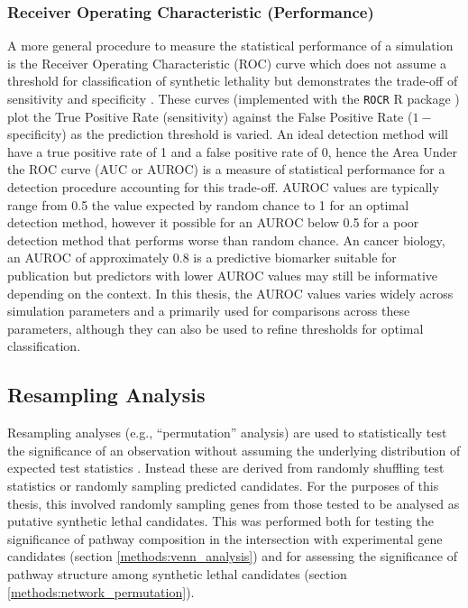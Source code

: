 \subsubsection{Receiver Operating Characteristic (Performance)}
A more general procedure to measure the statistical performance of a simulation is the Receiver Operating Characteristic (ROC) curve which does not assume a threshold for classification of synthetic lethality but demonstrates the trade-off of sensitivity and specificity \citep{Zweig1993, Fawcett2006, Akobeng2007}. These curves (implemented with the \texttt{ROCR} R package \citep{ROCR}) plot the True Positive Rate (sensitivity) against the False Positive Rate ($1-$ specificity) as the prediction threshold is varied. An ideal detection method will have a true positive rate of 1 and a false positive rate of 0, hence the Area Under the ROC curve (AUC or AUROC) is a measure of statistical performance for a detection procedure accounting for this trade-off. AUROC values are typically range from 0.5 the value expected by random chance to 1 for an optimal detection method, however it possible for an AUROC below 0.5 for a poor detection method that performs worse than random chance. An cancer biology, an AUROC of approximately $0.8$ is a predictive biomarker suitable for publication \citep{Hajian-Tilaki2013} but predictors with lower AUROC values may still be informative depending on the context. In this thesis, the AUROC values varies widely across simulation parameters and a primarily used for comparisons across these parameters, although they can also be used to refine thresholds for optimal classification. 

\subsection{Resampling Analysis} \label{methods:permutation}
Resampling analyses (e.g., ``permutation'' analysis) are used to statistically test the significance of an observation without assuming the underlying distribution of expected test statistics \citet{Collingridge2013}. Instead these are derived from randomly shuffling test statistics or randomly sampling predicted candidates. For the purposes of this thesis, this involved randomly sampling genes from those tested to be analysed as putative synthetic lethal candidates. This was performed both for testing the significance of pathway composition in the intersection with experimental gene candidates (section \ref{methods:venn_analysis}) and for assessing the significance of pathway structure among synthetic lethal candidates (section \ref{methods:network_permutation}).

